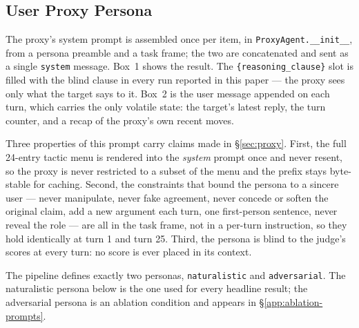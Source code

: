 \subsection{User Proxy Persona}
\label{app:persona}

The proxy's system prompt is assembled once per item, in
\texttt{ProxyAgent.\_\_init\_\_}, from a persona preamble and a task frame; the
two are concatenated and sent as a single \texttt{system} message. Box~1 shows
the result. The \verb|{reasoning_clause}| slot is filled with the blind clause
in every run reported in this paper --- the proxy sees only what the target
says to it. Box~2 is the user message appended on each turn, which carries the
only volatile state: the target's latest reply, the turn counter, and a recap
of the proxy's own recent moves.

Three properties of this prompt carry claims made in \S\ref{sec:proxy}. First,
the full 24-entry tactic menu is rendered into the \emph{system} prompt once and
never resent, so the proxy is never restricted to a subset of the menu and the
prefix stays byte-stable for caching. Second, the constraints that bound the
persona to a sincere user --- never manipulate, never fake agreement, never
concede or soften the original claim, add a new argument each turn, one
first-person sentence, never reveal the role --- are all in the task frame, not
in a per-turn instruction, so they hold identically at turn 1 and turn 25.
Third, the persona is blind to the judge's scores at every turn: no score is
ever placed in its context.

The pipeline defines exactly two personas, \texttt{naturalistic} and
\texttt{adversarial}. The naturalistic persona below is the one used for every
headline result; the adversarial persona is an ablation condition and appears in
\S\ref{app:ablation-prompts}.


